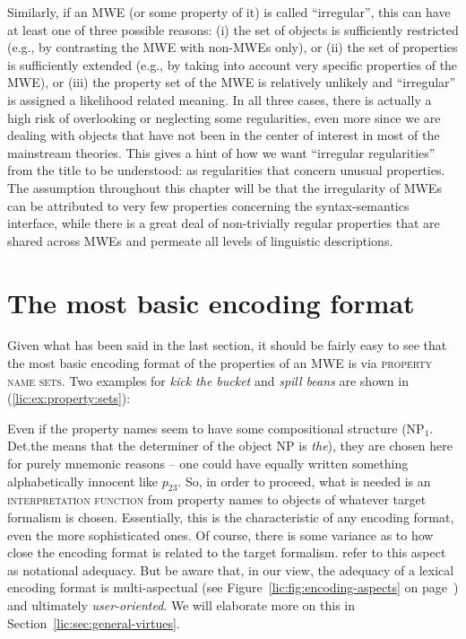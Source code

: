 \documentclass[output=paper
,modfonts
,nonflat
,biblatexbackend=biber
]{langsci/langscibook}
\begin{document}
Similarly, if an MWE (or some property of it) is called ``irregular'', this can have at least one of three possible reasons: (i) the set of objects is sufficiently restricted (e.g., by contrasting the MWE with non-MWEs only), or (ii) the set of properties is sufficiently extended (e.g., by taking into account very specific properties of the MWE), or (iii) the property set of the  MWE is relatively unlikely and ``irregular'' is assigned a likelihood related meaning. 
In all three cases, there is actually a high risk of overlooking or neglecting some regularities, even more since we are dealing with objects that have not been in the center of interest in most of the mainstream  theories. This gives a hint of how we want ``irregular regularities'' from the title to be understood: as regularities that concern unusual properties. The assumption throughout this chapter will be that the irregularity of MWEs can be attributed to very few properties concerning the syntax-semantics interface, while there is a great deal of non-trivially regular properties that are shared across MWEs and permeate all levels of linguistic descriptions.
 

\section{The most basic encoding format}
\label{lic:sec:simplest-encoding}

Given what has been said in the last section, it should be fairly easy to see  that the most basic encoding format of the properties of an MWE is via \textsc{property name sets}. Two examples for \textit{kick the bucket} and \textit{spill beans} are shown in (\ref{lic:ex:property:sets}):

\eal \label{lic:ex:property:sets}
\zl

Even if the property names seem to have some compositional structure (NP$_1$. Det.the means that the determiner of the object NP is \textit{the}), they are chosen here for purely mnemonic reasons -- one could have equally written something alphabetically innocent like $p_{23}$. So, in order to proceed, what is needed is an \textsc{interpretation function} from property names to objects of whatever target formalism is chosen. Essentially, this is the characteristic of any encoding format, even the more sophisticated ones. Of course, there is some variance as to how close the encoding format is related to the target formalism. \cite{daelemans:vanderlinden:92} refer to this aspect as notational adequacy. But be aware that, in our view, the adequacy of a lexical encoding format is multi-aspectual (see Figure~\ref{lic:fig:encoding-aspects} on page~\pageref{lic:fig:encoding-aspects}) and ultimately \textit{user-oriented}. We will elaborate more on this in Section~\ref{lic:sec:general-virtues}.
\end{document}
